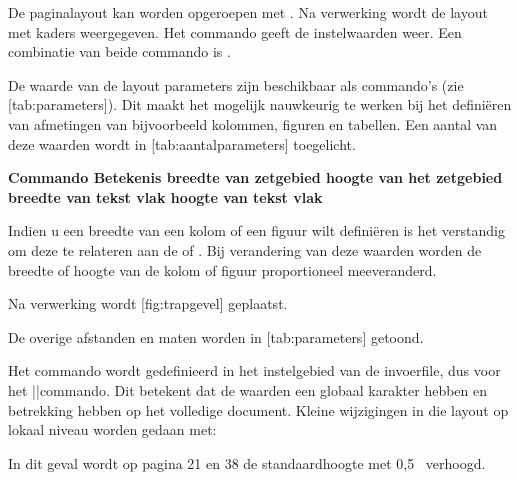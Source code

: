   {\tt\haalbuffer}

De paginalayout kan worden opgeroepen met \type{\toonkader}.
Na verwerking wordt de layout met kaders weergegeven. Het
commando \type{\tooninstellingen} geeft de instelwaarden
weer. Een combinatie van beide commando is
\type{\toonlayout}.

De waarde van de layout parameters zijn beschikbaar als
commando's (zie [tab:parameters]). Dit maakt het
mogelijk nauwkeurig te werken bij het defini\"eren van
afmetingen van bijvoorbeeld kolommen, figuren en tabellen.
Een aantal van deze waarden wordt in
[tab:aantalparameters] toegelicht.

\starttabel[|l|l|]
\HL
\NC \bf Commando         \NC \bf Betekenis            \NC\SR
\HL
\NC \type{\zetbreedte}   \NC breedte van zetgebied    \NC\FR
\NC \type{\zethoogte}    \NC hoogte van het zetgebied \NC\MR
\NC \type{\tekstbreedte} \NC breedte van tekst vlak   \NC\MR
\NC \type{\teksthoogte}  \NC hoogte van tekst vlak    \NC\LR
\HL
\stoptabel

Indien u een breedte van een kolom of een figuur wilt
defini\"eren is het verstandig om deze te relateren aan de
\type{\zetbreedte} of \type{\zethoogte}. Bij verandering van
deze waarden worden de breedte of hoogte van de kolom of
figuur proportioneel meeveranderd.

\startbuffer
{}
  {\externfiguur[ma-cb-19][breedte=.6\zetbreedte]}
\stopbuffer

\typebuffer

Na verwerking wordt [fig:trapgevel] geplaatst.

\haalbuffer

De overige afstanden en maten worden in
[tab:parameters] getoond.

Het commando \type{\stellayoutin} wordt gedefinieerd in het
instelgebied van de invoerfile, dus voor het
\type{\starttekst}||commando. Dit betekent dat de waarden een
globaal karakter hebben en betrekking hebben op het volledige
document. Kleine wijzigingen in die layout op lokaal niveau
worden gedaan met:

\startbuffer
\paslayoutaan[21,38][hoogte=+.5cm]
\stopbuffer

\typebuffer

In dit geval wordt op pagina 21 en 38 de standaardhoogte met
0,5 \Centi \Meter\ verhoogd.


